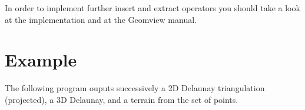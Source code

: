 In order to implement further insert and extract operators you should
take a look at the implementation and at the Geomview manual.


\section{Example}
The following program ouputs successively a 2D
Delaunay triangulation (projected), a 3D Delaunay, and a terrain
from the set of points.
